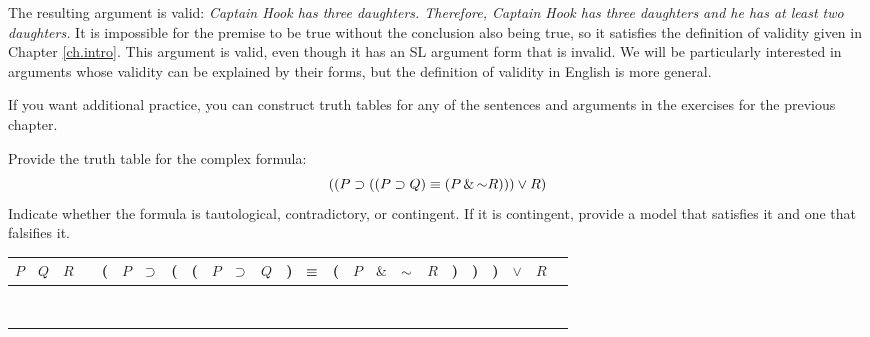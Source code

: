The resulting argument is valid: \emph{Captain Hook has three daughters. Therefore, Captain Hook has three daughters and he has at least two daughters.} It is impossible for the premise to be true without the conclusion also being true, so it satisfies the definition of validity given in Chapter \ref{ch.intro}. This argument is valid, even though it has an SL argument form that is invalid. We will be particularly interested in arguments whose validity can be explained by their forms, but the definition of validity in English is more general.

\iffalse

\practiceproblems
If you want additional practice, you can construct truth tables for any of the sentences and arguments in the exercises for the previous chapter.



\problempart
\label{HW2.E}
Provide the truth table for the complex formula:
$$((P \eif (( P \eif Q) \eiff (P \eand \enot R))) \eor R)$$
Indicate whether the formula is tautological, contradictory, or contingent. If it is contingent, provide a model that satisfies it and one that falsifies it.


\begin{tabular}{@{ }c@{ }@{ }c@{ }@{ }c | c@{ }@{}c@{}@{ }c@{ }@{ }c@{ }@{}c@{}@{}c@{}@{ }c@{ }@{ }c@{ }@{ }c@{ }@{}c@{}@{ }c@{ }@{}c@{}@{ }c@{ }@{ }c@{ }@{ }c@{ }@{ }c@{ }@{}c@{}@{}c@{}@{}c@{}@{ }c@{ }@{ }c@{ }@{ }c}
$P$ & $Q$ & $R$ &  & ( & $P$ & $\supset $ & ( & ( & $P$ & $\supset $ & $Q$ & ) & $\equiv $ & ( & $P$ & $\&$ & $\enot$ & $R$ & ) & ) & ) & $\lor$ & $R$ & \\
\hline 
 &  &  &  &  &  &  &  &  &  &  &  &  &  &  &  &  &  &  &  &  &  &  & & \\
 &  &  &  &  &  &  &  &  &  &  &  &  &  &  &  &  &  &  &  &  &  &  & & \\
  &  &  &  &  &  &  &  &  &  &  &  &  &  &  &  &  &  &  &  &  &  &  & & \\
 &  &  &  &  &  &  &  &  &  &  &  &  &  &  &  &  &  &  &  &  &  &  & & \\
 &  &  &  &  &  &  &  &  &  &  &  &  &  &  &  &  &  &  &  &  &  &  & & \\
  &  &  &  &  &  &  &  &  &  &  &  &  &  &  &  &  &  &  &  &  &  &  & & \\
 &  &  &  &  &  &  &  &  &  &  &  &  &  &  &  &  &  &  &  &  &  &  & & \\
  &  &  &  &  &  &  &  &  &  &  &  &  &  &  &  &  &  &  &  &  &  &  & & \\
\end{tabular}




